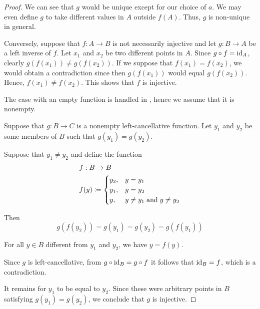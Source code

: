 \begin{proof}
  We can see that \( g \) would be unique except for our choice of \( a \). We may even define \( g \) to take different values in \( A \) outside \( f(A) \). Thus, \( g \) is non-unique in general.

  Conversely, suppose that \( f: A \to B \) is not necessarily injective and let \( g: B \to A \) be a left inverse of \( f \). Let \( x_1 \) and \( x_2 \) be two different points in \( A \). Since \( g \mathbin \circ f = \operatorname{id}_A \), clearly \( g(f(x_1)) \neq g(f(x_2)) \). If we suppose that \( f(x_1) = f(x_2) \), we would obtain a contradiction since then \( g(f(x_1)) \) would equal \( g(f(x_2)) \). Hence, \( f(x_1) \neq f(x_2) \). This shows that \( f \) is injective.

   The case with an empty function is handled in , hence we assume that it is nonempty.

  Suppose that \( g: B \to C \) is a nonempty left-cancellative function. Let \( y_1 \) and \( y_2 \) be some members of \( B \) such that \( g(y_1) = g(y_2) \).

  Suppose that \( y_1 \neq y_2 \) and define the function
  \begin{equation*}
    \begin{aligned}
      &f: B \to B \\
      &f(y) \coloneqq \begin{cases}
        y_2, &y = y_1 \\
        y_1, &y = y_2 \\
        y,   &y \neq y_1 \T{and} y \neq y_2
      \end{cases}
    \end{aligned}
  \end{equation*}

  Then
  \begin{equation*}
    g(f(y_2)) = g(y_1) = g(y_2) = g(f(y_1))
  \end{equation*}

  For all \( y \in B \) different from \( y_1 \) and \( y_2 \), we have \( y = f(y) \).

  Since \( g \) is left-cancellative, from \( g \mathbin \circ \operatorname{id}_B = g \mathbin \circ f \) it follows that \( \operatorname{id}_B = f \), which is a contradiction.

  It remains for \( y_1 \) to be equal to \( y_2 \). Since these were arbitrary points in \( B \) satisfying \( g(y_1) = g(y_2) \), we conclude that \( g \) is injective.


\end{proof}
